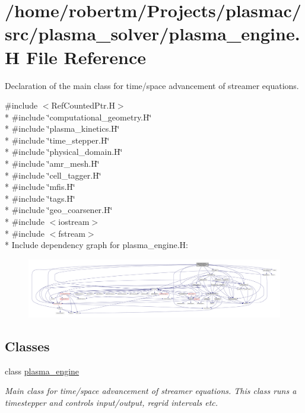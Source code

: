 \hypertarget{plasma__engine_8H}{}\section{/home/robertm/\+Projects/plasmac/src/plasma\+\_\+solver/plasma\+\_\+engine.H File Reference}
\label{plasma__engine_8H}


Declaration of the main class for time/space advancement of streamer equations.  


{\ttfamily \#include $<$Ref\+Counted\+Ptr.\+H$>$}\\*
{\ttfamily \#include \char`\"{}computational\+\_\+geometry.\+H\char`\"{}}\\*
{\ttfamily \#include \char`\"{}plasma\+\_\+kinetics.\+H\char`\"{}}\\*
{\ttfamily \#include \char`\"{}time\+\_\+stepper.\+H\char`\"{}}\\*
{\ttfamily \#include \char`\"{}physical\+\_\+domain.\+H\char`\"{}}\\*
{\ttfamily \#include \char`\"{}amr\+\_\+mesh.\+H\char`\"{}}\\*
{\ttfamily \#include \char`\"{}cell\+\_\+tagger.\+H\char`\"{}}\\*
{\ttfamily \#include \char`\"{}mfis.\+H\char`\"{}}\\*
{\ttfamily \#include \char`\"{}tags.\+H\char`\"{}}\\*
{\ttfamily \#include \char`\"{}geo\+\_\+coarsener.\+H\char`\"{}}\\*
{\ttfamily \#include $<$iostream$>$}\\*
{\ttfamily \#include $<$fstream$>$}\\*
Include dependency graph for plasma\+\_\+engine.\+H\+:\nopagebreak
\begin{figure}[H]
\begin{center}
\leavevmode
\includegraphics[width=350pt]{plasma__engine_8H__incl}
\end{center}
\end{figure}
\subsection*{Classes}
\begin{DoxyCompactItemize}
\item 
class \hyperlink{classplasma__engine}{plasma\+\_\+engine}
\begin{DoxyCompactList}\small\item\em Main class for time/space advancement of streamer equations. This class runs a timestepper and controls input/output, regrid intervals etc. \end{DoxyCompactList}\end{DoxyCompactItemize}



